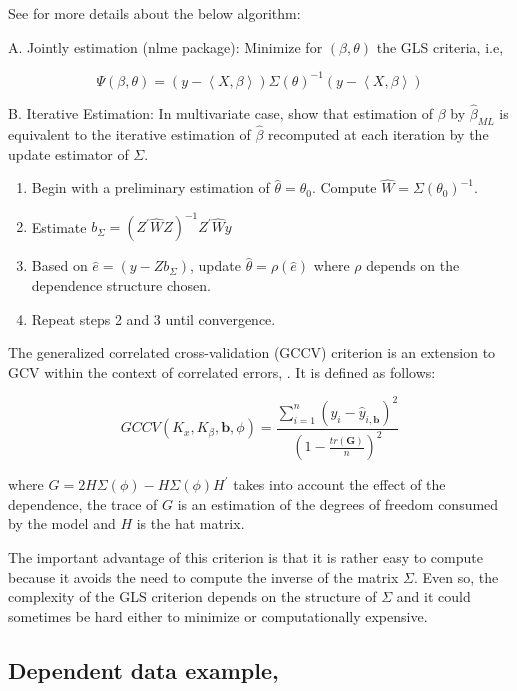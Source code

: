 \documentclass[
]{book}
\begin{document}
See \citet{Oviedo2018} for more details about the below algorithm:

A. Jointly estimation (nlme package): Minimize for \((\beta,\theta)\) the GLS criteria, i.e,

\[\Psi(\beta,\theta)=\left(y-\left\langle  X,\beta \right\rangle\right)\Sigma(\theta)^{-1}\left(y-\left\langle  X,\beta \right\rangle\right)\]

B. Iterative Estimation: In multivariate case, \citet{zivot2006modeling} show that estimation of \(\beta\) by \(\hat{\beta}_{ML}\) is equivalent to the iterative estimation of \(\hat{\beta}\) recomputed at each iteration by the update estimator of \(\Sigma\).

\begin{enumerate}
\def\labelenumi{\arabic{enumi}.}
\item
  Begin with a preliminary estimation of \(\hat{\theta}=\theta_0\). Compute \(\hat{W}=\Sigma(\theta_0)^{-1}\).
\item
  Estimate \({b}_\Sigma={(Z^\prime\hat{W}Z)^{-1}Z^\prime\hat{W}}y\)
\item
  Based on \(\hat{e}=({y-{Z}{b}_\Sigma})\), update \(\hat{\theta}=\rho({\hat{e}})\) where \(\rho\) depends on the dependence structure chosen.
\item
  Repeat steps 2 and 3 until convergence.
\end{enumerate}

The generalized correlated cross-validation (GCCV) criterion is an extension to GCV within the context of correlated errors, \citet{carmack2012generalised}. It is defined as follows:

\[GCCV(K_x,K_\beta,\mathbf{b},\phi)=\frac{\sum_{i=1}^n \left(y_{i}-\hat{y}_{i,\mathbf{b}}\right)^2}{
    \left({1-\frac{{tr}(\mathbf{G})}{n}}\right)^2} \]

where \({G}=2{H}\Sigma(\phi)-{H}\Sigma(\phi)H^\prime\) takes into account the effect of the dependence, the trace of \({G}\) is an estimation of the degrees of freedom consumed by the model and \({H}\) is the hat matrix.

The important advantage of this criterion is that it is rather easy to compute because it avoids the need to compute the inverse of the matrix \(\Sigma\). Even so, the complexity of the GLS criterion depends on the structure of \(\Sigma\) and it could sometimes be hard either to minimize or computationally expensive.

\hypertarget{dependent-data-example}{%
\subsection{Dependent data example,}\label{dependent-data-example}}
\end{document}
